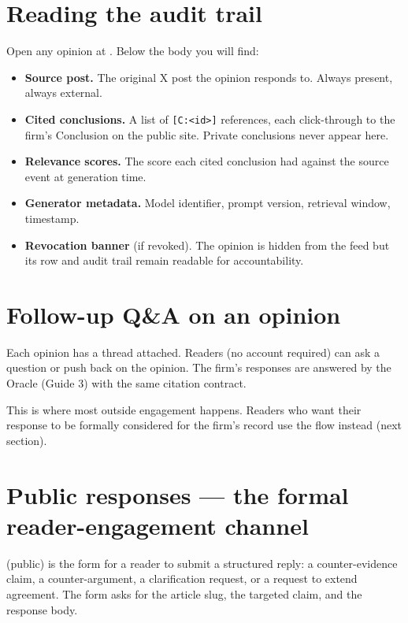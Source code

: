 \documentclass[11pt]{article}
\begin{document}
\section{Reading the audit trail}

Open any opinion at . Below the body you will
find:

\begin{itemize}[leftmargin=*,itemsep=0.2em]
  \item \textbf{Source post.} The original X post the opinion
        responds to. Always present, always external.
  \item \textbf{Cited conclusions.} A list of \texttt{[C:<id>]}
        references, each click-through to the firm's Conclusion on
        the public site. Private conclusions never appear here.
  \item \textbf{Relevance scores.} The score each cited conclusion
        had against the source event at generation time.
  \item \textbf{Generator metadata.} Model identifier, prompt
        version, retrieval window, timestamp.
  \item \textbf{Revocation banner} (if revoked). The opinion is
        hidden from the feed but its row and audit trail remain
        readable for accountability.
\end{itemize}


\section{Follow-up Q\&A on an opinion}

Each opinion has a  thread attached. Readers (no
account required) can ask a question or push back on the opinion. The
firm's responses are answered by the Oracle (Guide 3) with the same
citation contract.

This is where most outside engagement happens. Readers who want their
response to be formally considered for the firm's record use the
 flow instead (next section).

\section{Public responses --- the formal reader-engagement channel}

 (public) is the form for a reader to submit a
structured reply: a counter-evidence claim, a counter-argument, a
clarification request, or a request to extend agreement. The form
asks for the article slug, the targeted claim, and the response
body.
\end{document}
